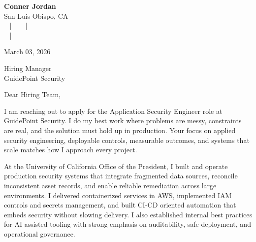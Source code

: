 \documentclass[letterpaper,11pt]{article}
\newcommand{\companyname}{GuidePoint Security}
\begin{document}
\begin{center}
  {\Huge \textbf{Conner Jordan}}\\[4pt]
  {\Large San Luis Obispo, CA}\\[4pt]
  \href{tel:+18059759793}{
    } ~ | ~
  \href{mailto:connercharlesjordan@gmail.com}{
    } ~ | ~
   \\
  \href{https://www.linkedin.com/in/conner-jordan-4b268514a/}{
    } ~ | ~
  \href{https://github.com/cjordan223}{
    }
\end{center}

\vspace{16pt}

\begin{flushright}
March 03, 2026
\end{flushright}

Hiring Manager\\
\companyname

\vspace{26pt}

\noindent
Dear Hiring Team,

\vspace{16pt}

I am reaching out to apply for the Application Security Engineer role at GuidePoint Security. I do my best work where problems are messy, constraints are real, and the solution must hold up in production. Your focus on applied security engineering, deployable controls, measurable outcomes, and systems that scale matches how I approach every project.

\vspace{16pt}

At the University of California Office of the President, I built and operate production security systems that integrate fragmented data sources, reconcile inconsistent asset records, and enable reliable remediation across large environments. I delivered containerized services in AWS, implemented IAM controls and secrets management, and built CI-CD oriented automation that embeds security without slowing delivery. I also established internal best practices for AI-assisted tooling with strong emphasis on auditability, safe deployment, and operational governance.
\end{document}
